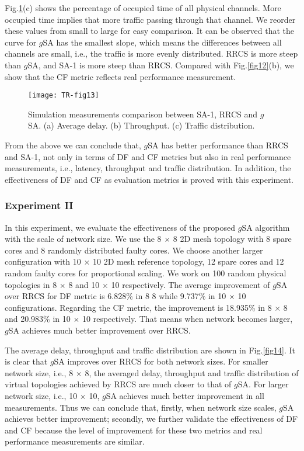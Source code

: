 Fig.\ref{fig13}(c) shows the percentage of occupied time of all physical channels. More occupied time implies that more traffic passing through that channel. We reorder these values from small to large for easy comparison. It can be observed that the curve for $g$SA has the smallest slope, which means the differences between all channels are small, i.e., the traffic is more evenly distributed. RRCS is more steep than $g$SA, and SA-1 is more steep than RRCS. Compared with Fig.\ref{fig12}(b), we show that the CF metric reflects real performance measurement.

\begin{figure}[h]
      \centering
        \texttt{[image: TR-fig13]}
        \caption{ Simulation measurements comparison between SA-1, RRCS and $g$SA. (a) Average delay. (b) Throughput. (c) Traffic distribution.}
        \label{fig13}
\end{figure}

From the above we can conclude that, $g$SA has better performance than RRCS and SA-1, not only in terms of DF and CF metrics but also in real performance measurements, i.e., latency, throughput and traffic distribution. In addition, the effectiveness of DF and CF as evaluation metrics is proved with this experiment.

\subsubsection{Experiment II}

In this experiment, we evaluate the effectiveness of the proposed  $g$SA algorithm with the scale of network size. We use the 8 $\times$ 8 2D mesh topology with 8 spare cores and 8 randomly distributed faulty cores. We choose another larger configuration with 10 $\times$ 10 2D mesh reference topology, 12 spare cores and 12 random faulty cores for proportional scaling. We work on 100 random physical topologies in 8 $\times$ 8 and 10 $\times$ 10 respectively. The average improvement of $g$SA over RRCS for DF metric is 6.828\% in 8 8 while 9.737\% in 10 $\times$ 10 configurations. Regarding the CF metric, the improvement is 18.935\% in 8 $\times$ 8 and 20.983\% in 10 $\times$ 10 respectively. That means when network becomes larger, $g$SA achieves much better improvement over RRCS.


The average delay, throughput and traffic distribution are shown in Fig.\ref{fig14}. It is clear that $g$SA improves over RRCS for both network sizes. For smaller network size, i.e., 8 $\times$ 8, the averaged delay, throughput and traffic distribution of virtual topologies achieved by RRCS are much closer to that of $g$SA. For larger network size, i.e., 10 $\times$ 10, $g$SA achieves much better improvement in all measurements. Thus we can conclude that, firstly, when network size scales, $g$SA achieves better improvement; secondly, we further validate the effectiveness of DF and CF because the level of improvement for these two metrics and real performance measurements are similar.

